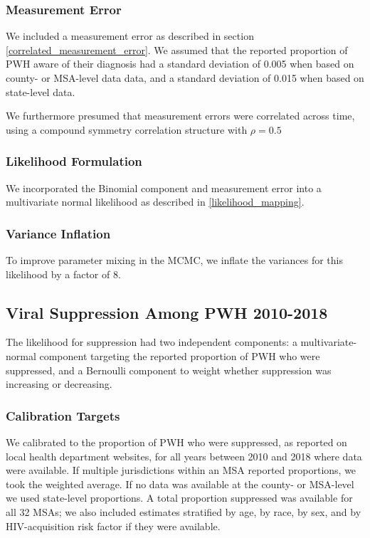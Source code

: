 \documentclass{article}
\begin{document}
\subsubsection{Measurement Error}

We included a measurement error as described in section \ref{correlated_measurement_error}. We assumed that the reported proportion of PWH aware of their diagnosis had a standard deviation of 0.005 when based on county- or MSA-level data data, and a standard deviation of 0.015 when based on state-level data.

We furthermore presumed that measurement errors were correlated across time, using a compound symmetry correlation structure with $\rho = 0.5$

\subsubsection{Likelihood Formulation}
We incorporated the Binomial component and measurement error into a multivariate normal likelihood as described in \ref{likelihood_mapping}.

\subsubsection{Variance Inflation}
To improve parameter mixing in the MCMC, we inflate the variances for this likelihood by a factor of 8.

\subsection{Viral Suppression Among PWH 2010-2018}\label{likelihood_suppression}

The likelihood for suppression had two independent components: a multivariate-normal component targeting the reported proportion of PWH who were suppressed, and a Bernoulli component to weight whether suppression was increasing or decreasing.

\subsubsection{Calibration Targets}
We calibrated to the proportion of PWH who were suppressed, as reported on local health department websites, for all years between 2010 and 2018 where data were available. If multiple jurisdictions within an MSA reported proportions, we took the weighted average. If no data was available at the county- or MSA-level we used state-level proportions. A total proportion suppressed was available for all 32 MSAs; we also included estimates stratified by age, by race, by sex, and by HIV-acquisition risk factor if they were available.
\end{document}
